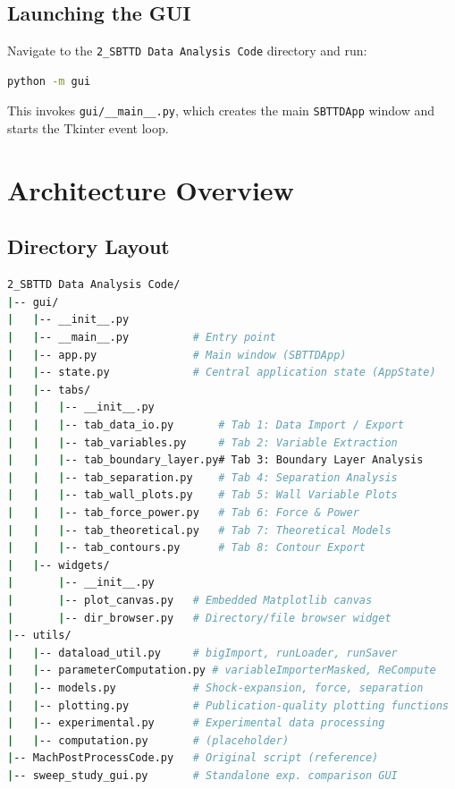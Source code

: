 \documentclass[11pt,letterpaper]{article}
\begin{document}
\subsection{Launching the GUI}

Navigate to the \texttt{2\_SBTTD Data Analysis Code} directory and run:

\begin{lstlisting}[language=bash]
python -m gui
\end{lstlisting}

This invokes \texttt{gui/\_\_main\_\_.py}, which creates the main
\texttt{SBTTDApp} window and starts the Tkinter event loop.

\section{Architecture Overview}

\subsection{Directory Layout}

\begin{lstlisting}[language=bash,numbers=none]
2_SBTTD Data Analysis Code/
|-- gui/
|   |-- __init__.py
|   |-- __main__.py          # Entry point
|   |-- app.py               # Main window (SBTTDApp)
|   |-- state.py             # Central application state (AppState)
|   |-- tabs/
|   |   |-- __init__.py
|   |   |-- tab_data_io.py       # Tab 1: Data Import / Export
|   |   |-- tab_variables.py     # Tab 2: Variable Extraction
|   |   |-- tab_boundary_layer.py# Tab 3: Boundary Layer Analysis
|   |   |-- tab_separation.py    # Tab 4: Separation Analysis
|   |   |-- tab_wall_plots.py    # Tab 5: Wall Variable Plots
|   |   |-- tab_force_power.py   # Tab 6: Force & Power
|   |   |-- tab_theoretical.py   # Tab 7: Theoretical Models
|   |   |-- tab_contours.py      # Tab 8: Contour Export
|   |-- widgets/
|       |-- __init__.py
|       |-- plot_canvas.py   # Embedded Matplotlib canvas
|       |-- dir_browser.py   # Directory/file browser widget
|-- utils/
|   |-- dataload_util.py     # bigImport, runLoader, runSaver
|   |-- parameterComputation.py # variableImporterMasked, ReCompute
|   |-- models.py            # Shock-expansion, force, separation
|   |-- plotting.py          # Publication-quality plotting functions
|   |-- experimental.py      # Experimental data processing
|   |-- computation.py       # (placeholder)
|-- MachPostProcessCode.py   # Original script (reference)
|-- sweep_study_gui.py       # Standalone exp. comparison GUI
\end{lstlisting}
\end{document}
